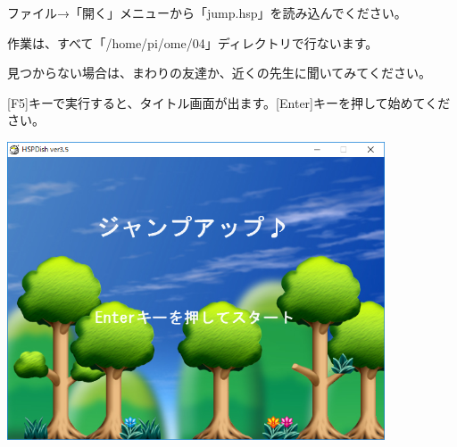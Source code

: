 \documentclass[a4paper,dvipdfmx]{jarticle}
\begin{document}
\bigskip

ファイル→「開く」メニューから「jump.hsp」を読み込んでください。

作業は、すべて「/home/pi/ome/04」ディレクトリで行ないます。

見つからない場合は、まわりの友達か、近くの先生に聞いてみてください。


\bigskip

[F5]キーで実行すると、タイトル画面が出ます。[Enter]キーを押して始めてください。


\bigskip



\begin{center}
\includegraphics[width=11.192cm,height=8.827cm]{text04-img/text04-img022.png}

\end{center}

\bigskip


\bigskip


\bigskip


\bigskip


\bigskip


\bigskip


\bigskip


\bigskip


\bigskip


\bigskip


\bigskip


\bigskip


\bigskip


\bigskip


\bigskip


\bigskip


\bigskip
\end{document}
